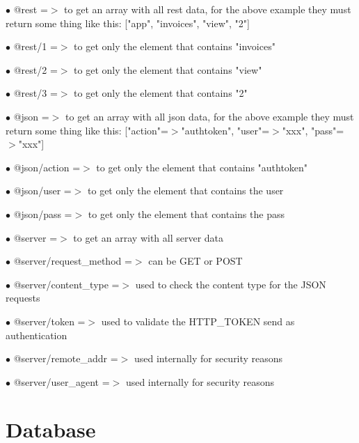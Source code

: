\documentclass[a4paper]{book}
\begin{document}
\begin{compactitem}
\item[\color{myblue}$\bullet$] @rest                  =$>$ to get an array with all rest data, for the above example they
                          must return some thing like this:
                          ["app", "invoices", "view", "2"]
\item[\color{myblue}$\bullet$] @rest/1                =$>$ to get only the element that contains "invoices"
\item[\color{myblue}$\bullet$] @rest/2                =$>$ to get only the element that contains "view"
\item[\color{myblue}$\bullet$] @rest/3                =$>$ to get only the element that contains "2"
\item[\color{myblue}$\bullet$] @json                  =$>$ to get an array with all json data, for the above example they
                          must return some thing like this:
                          ["action"=$>$"authtoken", "user"=$>$"xxx", "pass"=$>$"xxx"]
\item[\color{myblue}$\bullet$] @json/action           =$>$ to get only the element that contains "authtoken"
\item[\color{myblue}$\bullet$] @json/user             =$>$ to get only the element that contains the user
\item[\color{myblue}$\bullet$] @json/pass             =$>$ to get only the element that contains the pass
\item[\color{myblue}$\bullet$] @server                =$>$ to get an array with all server data
\item[\color{myblue}$\bullet$] @server/request\_method =$>$ can be GET or POST
\item[\color{myblue}$\bullet$] @server/content\_type   =$>$ used to check the content type for the JSON requests
\item[\color{myblue}$\bullet$] @server/token          =$>$ used to validate the HTTP\_TOKEN send as authentication
\item[\color{myblue}$\bullet$] @server/remote\_addr    =$>$ used internally for security reasons
\item[\color{myblue}$\bullet$] @server/user\_agent     =$>$ used internally for security reasons
\end{compactitem}


\hypertarget{toc305}{}
\chapter{Database}
\end{document}
